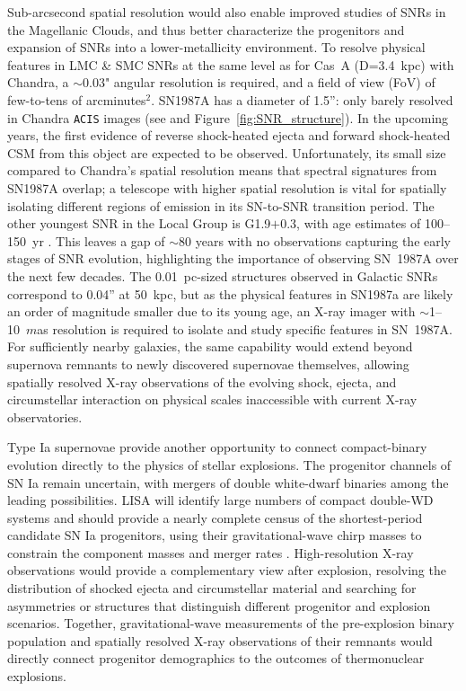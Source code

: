 \documentclass{article}
\begin{document}
Sub-arcsecond spatial resolution would also enable improved studies of SNRs in the Magellanic Clouds, and thus better characterize the progenitors and expansion of SNRs into a lower-metallicity environment. To resolve physical features in LMC \& SMC SNRs at the same level as for Cas~A (D=3.4~kpc) with Chandra, a $\sim$0.03" angular resolution is required, and a field of view (FoV) of few-to-tens of arcminutes$^2$. SN1987A has a diameter of 1.5'': only barely resolved in Chandra \texttt{ACIS} images (see \cite{2016ApJ...829...40F} and Figure~\ref{fig:SNR_structure}). In the upcoming years, the first evidence of reverse shock-heated ejecta and forward shock-heated CSM from this object are expected to be observed. Unfortunately, its small size compared to Chandra's spatial resolution means that spectral signatures from SN1987A overlap; a telescope with higher spatial resolution is vital for spatially isolating different regions of emission in its SN-to-SNR transition period. The other youngest SNR in the Local Group is G1.9$+$0.3, with age estimates of 100--150~yr \cite{2011ApJ...737L..22C,2008ApJ...680L..41R}. This leaves a gap of $\sim$80 years with no observations capturing the early stages of SNR evolution, highlighting the importance of observing SN~1987A over the next few decades. The 0.01~pc-sized structures observed in Galactic SNRs correspond to 0.04'' at 50~kpc, but as the physical features in SN1987a are likely an order of magnitude smaller due to its young age, an X-ray imager with $\sim$1--10~$m$as resolution is required to isolate and study specific features in SN~1987A. For sufficiently nearby galaxies, the same capability would extend beyond supernova remnants to newly discovered supernovae themselves, allowing spatially resolved X-ray observations of the evolving shock, ejecta, and circumstellar interaction on physical scales inaccessible with current X-ray observatories.

Type Ia supernovae provide another opportunity to connect compact-binary evolution directly to the physics of stellar explosions. The progenitor channels of SN Ia remain uncertain, with mergers of double white-dwarf binaries among the leading possibilities. LISA will identify large numbers of compact double-WD systems and should provide a nearly complete census of the shortest-period candidate SN Ia progenitors, using their gravitational-wave chirp masses to constrain the component masses and merger rates \cite{2019MNRAS.482.3656R,2024A&A...691A..44K}. High-resolution X-ray observations would provide a complementary view after explosion, resolving the distribution of shocked ejecta and circumstellar material and searching for asymmetries or structures that distinguish different progenitor and explosion scenarios. Together, gravitational-wave measurements of the pre-explosion binary population and spatially resolved X-ray observations of their remnants would directly connect progenitor demographics to the outcomes of thermonuclear explosions.
\end{document}

